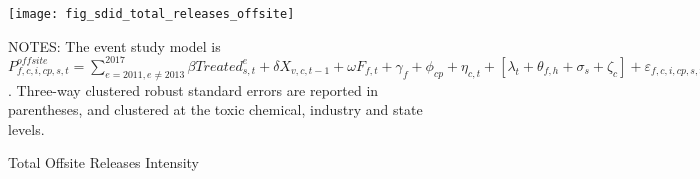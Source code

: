 \begin{figure}[H]
    \centering
    \texttt{[image: fig\_sdid\_total\_releases\_offsite]}
    \caption{Total Offsite Releases Intensity}
    \label{fig:baseline-offsite-total-releases-intensity}
    \begin{minipage}{\columnwidth}
        \vspace{0.05in}
        \tiny NOTES: The event study model is $P_{f,c,i,cp,s,t}^{offsite} = \sum_{{e = 2011},{e \neq 2013}}^{2017} \beta Treated_{s,t}^e + \delta X_{v,c,t-1} + \omega F_{f,t} + \gamma_{f} + \phi_{cp} + \eta_{c,t} + \left[\lambda_{t} + \theta_{f,h} + \sigma_{s} + \zeta_{c} \right] + \varepsilon_{f,c,i,cp,s,t}$. Three-way clustered robust standard errors are reported in parentheses, and clustered at the toxic chemical, industry and state levels.
    \end{minipage}
\end{figure}